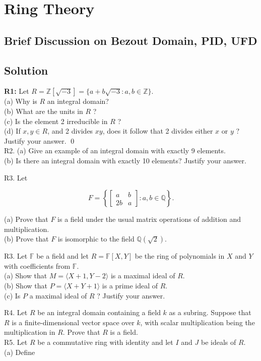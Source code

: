 \chapter{Ring Theory}
\setcounter{equation}{0}
\setcounter{table}{0}
\setcounter{figure}{0}

\section{Brief Discussion on Bezout Domain, PID, UFD}
\section{Solution}
\textbf{R1:} Let $R=\mathbb{Z}[\sqrt{-3}]=\{a+b \sqrt{-3}: a, b \in \mathbb{Z}\}$.\\
(a) Why is $R$ an integral domain?\\
(b) What are the units in $R$ ?\\
(c) Is the element 2 irreducible in $R$ ?\\
(d) If $x, y \in R$, and 2 divides $x y$, does it follow that 2 divides either $x$ or $y$ ? Justify your answer.
\soln
\qed\\

R2. (a) Give an example of an integral domain with exactly 9 elements.\\
(b) Is there an integral domain with exactly 10 elements? Justify your answer.

R3. Let

$$
F=\left\{\left[\begin{array}{cc}
	a & b \\
	2 b & a
\end{array}\right]: a, b \in \mathbb{Q}\right\} .
$$

(a) Prove that $F$ is a field under the usual matrix operations of addition and multiplication.\\
(b) Prove that $F$ is isomorphic to the field $\mathbb{Q}(\sqrt{2})$.

R3. Let $\mathbb{F}$ be a field and let $R=\mathbb{F}[X, Y]$ be the ring of polynomials in $X$ and $Y$ with coefficients from $\mathbb{F}$.\\
(a) Show that $M=\langle X+1, Y-2\rangle$ is a maximal ideal of $R$.\\
(b) Show that $P=\langle X+Y+1\rangle$ is a prime ideal of $R$.\\
(c) Is $P$ a maximal ideal of $R$ ? Justify your answer.

R4. Let $R$ be an integral domain containing a field $k$ as a subring. Suppose that $R$ is a finite-dimensional vector space over $k$, with scalar multiplication being the multiplication in $R$. Prove that $R$ is a field.\\
R5. Let $R$ be a commutative ring with identity and let $I$ and $J$ be ideals of $R$.\\
(a) Define

